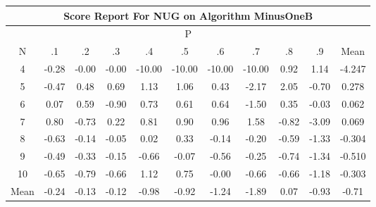 \documentclass[11pt,a4paper]{report}
\begin{document}
\begin{longtable}{ | c || c | c | c | c | c | c | c | c | c || c |}
\hline
\multicolumn{11}{|c|}{ Score Report For NUG on Algorithm MinusOneB} \\
\hline
\multicolumn{11}{|c|}{ P } \\
\hline
N & .1 & .2 & .3 & .4 & .5 & .6 & .7 & .8 & .9 & Mean\\
 \hline
 \hline
 \endhead
  4 &  \cellcolor[HTML]{FFF7F7} -0.28 &  \cellcolor[HTML]{FFFFFF} -0.00 &  \cellcolor[HTML]{FFFFFF} -0.00 &  \cellcolor[HTML]{FF0000} -10.00 &  \cellcolor[HTML]{FF0000} -10.00 &  \cellcolor[HTML]{FF0000} -10.00 &  \cellcolor[HTML]{FF0000} -10.00 &  \cellcolor[HTML]{E7E7FF} 0.92 &  \cellcolor[HTML]{DFDFFF} 1.14 & -4.247 \\
  5 &  \cellcolor[HTML]{FFF7F7} -0.47 &  \cellcolor[HTML]{EFEFFF} 0.48 &  \cellcolor[HTML]{EFEFFF} 0.69 &  \cellcolor[HTML]{DFDFFF} 1.13 &  \cellcolor[HTML]{E7E7FF} 1.06 &  \cellcolor[HTML]{F7F7FF} 0.43 &  \cellcolor[HTML]{FFC7C7} -2.17 &  \cellcolor[HTML]{CFCFFF} 2.05 &  \cellcolor[HTML]{FFEFEF} -0.70 & 0.278 \\
  6 &  \cellcolor[HTML]{FFFFFF} 0.07 &  \cellcolor[HTML]{EFEFFF} 0.59 &  \cellcolor[HTML]{FFE7E7} -0.90 &  \cellcolor[HTML]{EFEFFF} 0.73 &  \cellcolor[HTML]{EFEFFF} 0.61 &  \cellcolor[HTML]{EFEFFF} 0.64 &  \cellcolor[HTML]{FFD7D7} -1.50 &  \cellcolor[HTML]{F7F7FF} 0.35 &  \cellcolor[HTML]{FFFFFF} -0.03 & 0.062 \\
  7 &  \cellcolor[HTML]{E7E7FF} 0.80 &  \cellcolor[HTML]{FFEFEF} -0.73 &  \cellcolor[HTML]{F7F7FF} 0.22 &  \cellcolor[HTML]{E7E7FF} 0.81 &  \cellcolor[HTML]{E7E7FF} 0.90 &  \cellcolor[HTML]{E7E7FF} 0.96 &  \cellcolor[HTML]{D7D7FF} 1.58 &  \cellcolor[HTML]{FFE7E7} -0.82 &  \cellcolor[HTML]{FFAFAF} -3.09 & 0.069 \\
  8 &  \cellcolor[HTML]{FFEFEF} -0.63 &  \cellcolor[HTML]{FFFFFF} -0.14 &  \cellcolor[HTML]{FFFFFF} -0.05 &  \cellcolor[HTML]{FFFFFF} 0.02 &  \cellcolor[HTML]{F7F7FF} 0.33 &  \cellcolor[HTML]{FFFFFF} -0.14 &  \cellcolor[HTML]{FFF7F7} -0.20 &  \cellcolor[HTML]{FFEFEF} -0.59 &  \cellcolor[HTML]{FFDFDF} -1.33 & -0.304 \\
  9 &  \cellcolor[HTML]{FFEFEF} -0.49 &  \cellcolor[HTML]{FFF7F7} -0.33 &  \cellcolor[HTML]{FFFFFF} -0.15 &  \cellcolor[HTML]{FFEFEF} -0.66 &  \cellcolor[HTML]{FFFFFF} -0.07 &  \cellcolor[HTML]{FFEFEF} -0.56 &  \cellcolor[HTML]{FFF7F7} -0.25 &  \cellcolor[HTML]{FFEFEF} -0.74 &  \cellcolor[HTML]{FFDFDF} -1.34 & -0.510 \\
  10 &  \cellcolor[HTML]{FFEFEF} -0.65 &  \cellcolor[HTML]{FFEFEF} -0.79 &  \cellcolor[HTML]{FFEFEF} -0.66 &  \cellcolor[HTML]{DFDFFF} 1.12 &  \cellcolor[HTML]{EFEFFF} 0.75 &  \cellcolor[HTML]{FFFFFF} -0.00 &  \cellcolor[HTML]{FFEFEF} -0.66 &  \cellcolor[HTML]{FFEFEF} -0.66 &  \cellcolor[HTML]{FFDFDF} -1.18 & -0.303 \\
 \hline
 \hline
Mean &  \cellcolor[HTML]{FFF7F7} -0.24 &  \cellcolor[HTML]{FFFFFF} -0.13 &  \cellcolor[HTML]{FFFFFF} -0.12 &  \cellcolor[HTML]{FFE7E7} -0.98 &  \cellcolor[HTML]{FFE7E7} -0.92 &  \cellcolor[HTML]{FFDFDF} -1.24 &  \cellcolor[HTML]{FFCFCF} -1.89 &  \cellcolor[HTML]{FFFFFF} 0.07 &  \cellcolor[HTML]{FFE7E7} -0.93 &  \cellcolor[HTML]{FFEFEF} -0.71
\end{longtable}
\end{document}
